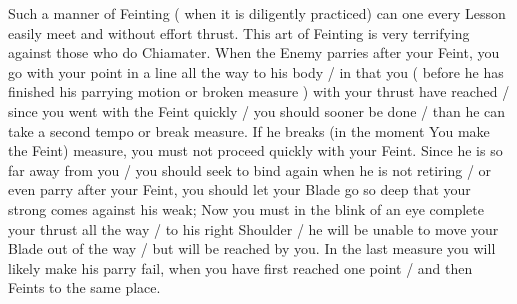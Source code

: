 \newpage


\newpage



Such a manner  of Feinting ( when it is diligently practiced) can one
every Lesson easily meet and without effort thrust. This art of
Feinting is very terrifying against those who do Chiamater. When the
Enemy parries after your Feint, you go with your point in a line all
the way to his body / in that you ( before he has finished his
parrying motion or broken measure ) with your thrust have reached /
since you went with the Feint quickly / you should sooner be done /
than he can take a second tempo or break measure. If he breaks (in the
moment You make the Feint) measure, you must not proceed quickly with
your Feint. Since he is so far away from you / you should seek to bind
again when he is not retiring / or even parry after your Feint, you
should let your Blade go so deep that your strong comes against his
weak; Now you must in the blink of an eye complete your thrust all the
way / to his right Shoulder / he will be unable to move your Blade out
of the way / but will be reached by you. In the last measure you will
likely make his parry fail, when you have first reached one point /
and then Feints to the same place.

